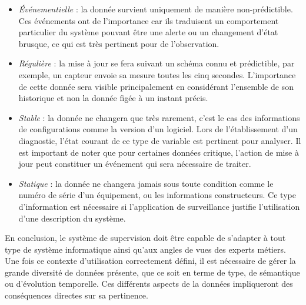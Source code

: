 \begin{itemize}
    \begin{itemize} 
        \item \textit{Événementielle} : la donnée survient uniquement de manière non-prédictible. Ces événements ont de l'importance car ils traduisent un comportement particulier du système pouvant être une alerte ou un changement d'état brusque, ce qui est très pertinent pour de l'observation.
        \item \textit{Régulière} : la mise à jour se fera suivant un schéma connu et prédictible, par exemple, un capteur envoie sa mesure toutes les cinq secondes. L'importance de cette donnée sera visible principalement en considérant l'ensemble de son historique et non la donnée figée à un instant précis.
        \item \textit{Stable} : la donnée ne changera que très rarement, c'est le cas des informations de configurations comme la version d'un logiciel. Lors de l'établissement d'un diagnostic, l'état courant de ce type de variable est pertinent pour analyser. Il est important de noter que pour certaines données critique, l'action de mise à jour peut constituer un événement qui sera nécessaire de traiter.
        \item \textit{Statique} : la donnée ne changera jamais sous toute condition comme le numéro de série d'un équipement, ou les informations constructeurs. Ce type d'information est nécessaire si l'application de surveillance justifie l'utilisation d'une description du système.
    \end{itemize}
\end{itemize}

En conclusion, le système de supervision doit être capable de s'adapter à tout type de système informatique ainsi qu'aux angles de vues des experts métiers. Une fois ce contexte d'utilisation correctement défini, il est nécessaire de gérer la grande diversité de données présente, que ce soit en terme de type, de sémantique ou d'évolution temporelle. Ces différents aspects de la données impliqueront des conséquences directes sur sa pertinence.

